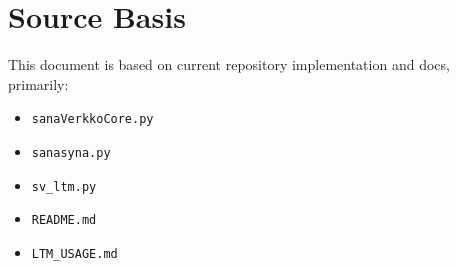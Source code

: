 \documentclass[11pt,a4paper]{report}
\begin{document}
\chapter*{Source Basis}
This document is based on current repository implementation and docs, primarily:
\begin{itemize}
  \item \texttt{sanaVerkkoCore.py}
  \item \texttt{sanasyna.py}
  \item \texttt{sv\_ltm.py}
  \item \texttt{README.md}
  \item \texttt{LTM\_USAGE.md}
\end{itemize}
\end{document}
